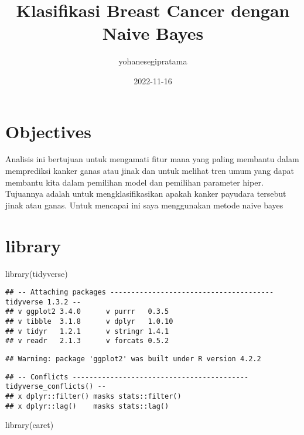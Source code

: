 \documentclass[
]{article}
\title{Klasifikasi Breast Cancer dengan Naive Bayes}
\author{yohanesegipratama}
\date{2022-11-16}
\newenvironment{Shaded}{\begin{snugshade}}{\end{snugshade}}
\newcommand{\FunctionTok}[1]{\textcolor[rgb]{0.00,0.00,0.00}{#1}}
\newcommand{\NormalTok}[1]{#1}
\begin{document}
\maketitle

{
\setcounter{tocdepth}{2}
\tableofcontents
}
\hypertarget{objectives}{%
\section{Objectives}\label{objectives}}

Analisis ini bertujuan untuk mengamati fitur mana yang paling membantu
dalam memprediksi kanker ganas atau jinak dan untuk melihat tren umum
yang dapat membantu kita dalam pemilihan model dan pemilihan parameter
hiper. Tujuannya adalah untuk mengklasifikasikan apakah kanker payudara
tersebut jinak atau ganas. Untuk mencapai ini saya menggunakan metode
naive bayes

\hypertarget{library}{%
\section{library}\label{library}}

\begin{Shaded}
\begin{Highlighting}[]
\FunctionTok{library}\NormalTok{(tidyverse)}
\end{Highlighting}
\end{Shaded}

\begin{verbatim}
## -- Attaching packages --------------------------------------- tidyverse 1.3.2 --
## v ggplot2 3.4.0      v purrr   0.3.5 
## v tibble  3.1.8      v dplyr   1.0.10
## v tidyr   1.2.1      v stringr 1.4.1 
## v readr   2.1.3      v forcats 0.5.2
\end{verbatim}

\begin{verbatim}
## Warning: package 'ggplot2' was built under R version 4.2.2
\end{verbatim}

\begin{verbatim}
## -- Conflicts ------------------------------------------ tidyverse_conflicts() --
## x dplyr::filter() masks stats::filter()
## x dplyr::lag()    masks stats::lag()
\end{verbatim}

\begin{Shaded}
\begin{Highlighting}[]
\FunctionTok{library}\NormalTok{(caret)}
\end{Highlighting}
\end{Shaded}
\end{document}
